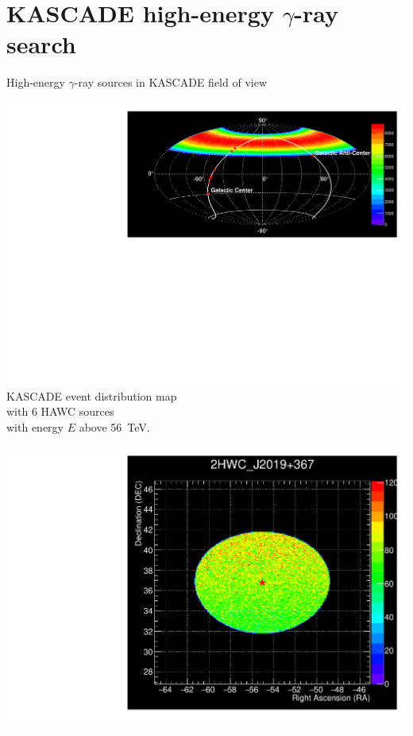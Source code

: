 \section{KASCADE high-energy \texorpdfstring{$\gamma$}{gamma}-ray search}

\begin{frame}{High-energy $\gamma$-ray sources in KASCADE field of view}
\begin{minipage}[c]{0.73\textwidth}
\begin{center}
  \includegraphics[width=1\textwidth]{pics/Skymap_6srcs.pdf}\\
  KASCADE event distribution map\\
  with 6 HAWC sources\\
  with energy $E$ above 56~TeV.
\end{center}
\end{minipage}
\hfill
\begin{minipage}[c]{0.25\textwidth}
\includegraphics[width=1\textwidth]{pics/Skymap_2HWC_J2019+367.pdf}\\

\end{minipage}
\end{frame}
